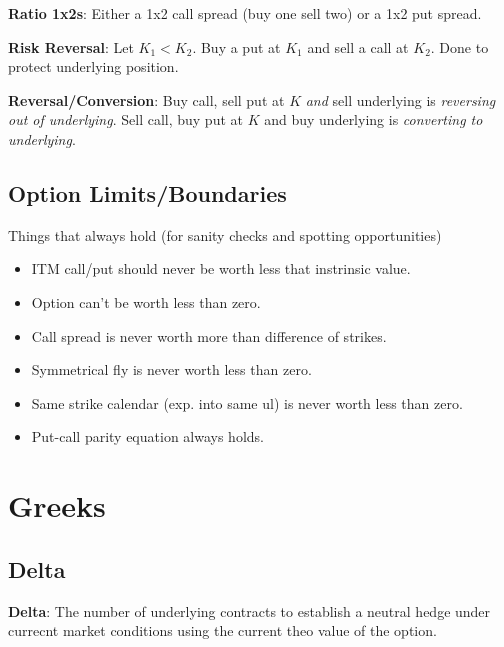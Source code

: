 \documentclass{article}
\begin{document}
\textbf{Ratio 1x2s}: Either a 1x2 call spread (buy one sell two) or a 1x2 put spread.

\textbf{Risk Reversal}: Let $K_1 < K_2$. Buy a put at $K_1$ and sell a call at
$K_2$. Done to protect underlying position.

\textbf{Reversal/Conversion}: Buy call, sell put at $K$ \textit{and} sell
underlying is \textit{reversing out of underlying}. Sell call, buy put at $K$ and buy underlying
is \textit{converting to underlying}.

\subsection*{Option Limits/Boundaries}
Things that always hold (for sanity checks and spotting opportunities)
\begin{itemize}
    \item ITM call/put should never be worth less that instrinsic value.
    \item Option can't be worth less than zero.
    \item Call spread is never worth more than difference of strikes.
    \item Symmetrical fly is never worth less than zero.
    \item Same strike calendar (exp. into same ul) is never worth less than
    zero.
    \item Put-call parity equation always holds.
\end{itemize}

\section{Greeks}
\subsection{Delta}
\textbf{Delta}: The number of underlying contracts to establish a neutral hedge
under currecnt market conditions using the current theo value of the option.
\end{document}
